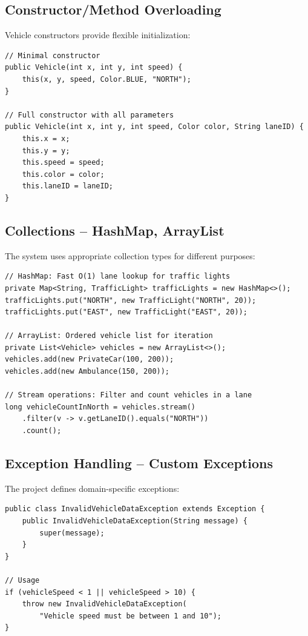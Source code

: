 \documentclass[12pt,a4paper]{article}
\begin{document}
\subsection{Constructor/Method Overloading}
Vehicle constructors provide flexible initialization:

\begin{lstlisting}
// Minimal constructor
public Vehicle(int x, int y, int speed) {
    this(x, y, speed, Color.BLUE, "NORTH");
}

// Full constructor with all parameters
public Vehicle(int x, int y, int speed, Color color, String laneID) {
    this.x = x;
    this.y = y;
    this.speed = speed;
    this.color = color;
    this.laneID = laneID;
}
\end{lstlisting}

\subsection{Collections – HashMap, ArrayList}
The system uses appropriate collection types for different purposes:

\begin{lstlisting}
// HashMap: Fast O(1) lane lookup for traffic lights
private Map<String, TrafficLight> trafficLights = new HashMap<>();
trafficLights.put("NORTH", new TrafficLight("NORTH", 20));
trafficLights.put("EAST", new TrafficLight("EAST", 20));

// ArrayList: Ordered vehicle list for iteration
private List<Vehicle> vehicles = new ArrayList<>();
vehicles.add(new PrivateCar(100, 200));
vehicles.add(new Ambulance(150, 200));

// Stream operations: Filter and count vehicles in a lane
long vehicleCountInNorth = vehicles.stream()
    .filter(v -> v.getLaneID().equals("NORTH"))
    .count();
\end{lstlisting}

\subsection{Exception Handling – Custom Exceptions}
The project defines domain-specific exceptions:

\begin{lstlisting}
public class InvalidVehicleDataException extends Exception {
    public InvalidVehicleDataException(String message) {
        super(message);
    }
}

// Usage
if (vehicleSpeed < 1 || vehicleSpeed > 10) {
    throw new InvalidVehicleDataException(
        "Vehicle speed must be between 1 and 10");
}
\end{lstlisting}
\end{document}
